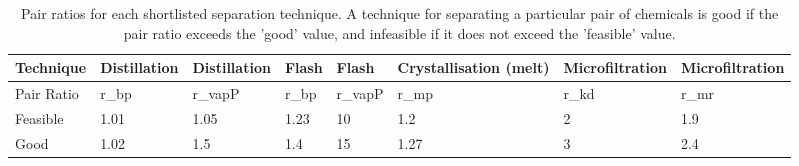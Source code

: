 \begin{table}[]
\centering
\caption{Pair ratios for each shortlisted separation technique. A technique for separating a particular pair of chemicals is good if the pair ratio exceeds the 'good' value, and infeasible if it does not exceed the 'feasible' value.}
\label{tab:separation pair ratio}
\begin{tabular}{@{}llllllll@{}}
\toprule
Technique  & Distillation & Distillation & Flash & Flash   & Crystallisation (melt) & Microfiltration & Microfiltration \\ \midrule
Pair Ratio & r\_bp        & r\_vapP      & r\_bp & r\_vapP & r\_mp                  & r\_kd           & r\_mr           \\
Feasible   & 1.01         & 1.05         & 1.23  & 10      & 1.2                    & 2               & 1.9             \\
Good       & 1.02         & 1.5          & 1.4   & 15      & 1.27                   & 3               & 2.4             \\ \bottomrule
\end{tabular}
\end{table}